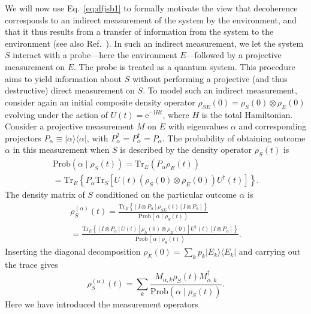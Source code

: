 \documentclass[aps,pra,reprint,amsmath,amssymb,showpacs,nofootinbib,floatfix,onecolumn,12pt]{revtex4-1}
\newcommand{\ketbra}[2]{\ensuremath{|{#1 \rangle}{\langle #2}|}}
\newcommand{\E}{\text{e}}
\newcommand{\I}{\text{i}}
\begin{document}
We will now use Eq.~\eqref{eq:dfjsb1} to formally motivate the view that decoherence corresponds to an indirect measurement of the system by the environment, and that it thus results from a transfer of information from the system to the environment (see also Ref.~\cite{Hornberger:2009:aq}). In such an indirect measurement, we let the system $S$ interact with a probe---here the environment $E$---followed by a projective measurement on $E$. The probe is treated as a quantum system. This procedure aims to yield information about $S$ without performing a projective (and thus destructive) direct measurement on $S$. To model such an indirect measurement, consider again an initial composite density operator $\rho_{SE}(0) = \rho_S(0) \otimes \rho_E(0)$ evolving under the action of $U(t) = \E^{-\I H t}$, where $H$ is the total Hamiltonian. Consider a projective measurement $M$ on $E$ with eigenvalues $\alpha$ and corresponding projectors $P_\alpha \equiv \ketbra{\alpha}{\alpha}$, with $P_\alpha^2=P_\alpha^\dagger=P_\alpha$. The probability of obtaining outcome $\alpha$ in this measurement when $S$ is described by the density operator $\rho_S(t)$ is
%
\begin{multline}
 \text{Prob}\left(\alpha \mid \rho_S(t) \right) = \text{Tr}_E \left( P_\alpha \rho_E(t) \right)  \\ =\text{Tr}_E \left\{ P_\alpha \text{Tr}_S \left[ U(t) \left( \rho_S(0) \otimes \rho_E(0) \right) U^\dagger(t)\right] \right\}.
\end{multline}
%
The density matrix of $S$ conditioned on the particular outcome $\alpha$ is
%
\begin{multline}
\rho_S^{(\alpha)}(t) = 
\frac{ \text{Tr}_E \left\{ \left[I \otimes P_\alpha \right] \rho_{SE}(t) \left[I \otimes P_\alpha \right] \right\}}{\text{Prob}\left(\alpha \mid \rho_S(t)\right)}\\
=\frac{ \text{Tr}_E \left\{ \left[I \otimes P_\alpha \right] U(t) \left[ \rho_S(0) \otimes \rho_E(0) \right] U^\dagger(t)  \left[I \otimes P_\alpha \right] \right\}}{\text{Prob}\left(\alpha \mid \rho_S(t)\right)}.\label{eq:hiuvb}
\end{multline}
%
Inserting the diagonal decomposition $\rho_E(0) = \sum_k p_k \ketbra{E_k}{E_k}$ and carrying out the trace gives \cite{Hornberger:2009:aq}
%
\begin{equation}
\rho_S^{(\alpha)}(t) = \sum_k \frac{ M_{\alpha,k}  \rho_S(t) M^\dagger_{\alpha,k}}{\text{Prob}\left(\alpha \mid \rho_S(t)\right)}.
\end{equation}
%
Here we have introduced the measurement operators
\end{document}
